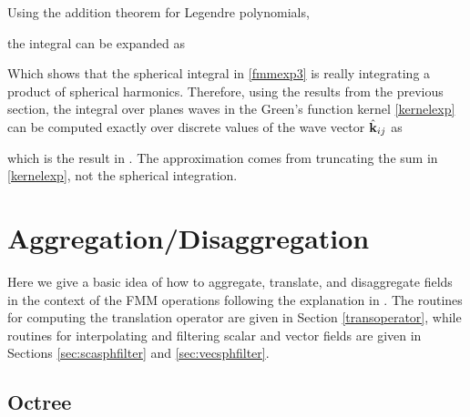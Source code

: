 Using the addition theorem for Legendre polynomials, 

the integral can be expanded as 

Which shows that the spherical integral in \eqref{fmmexp3} is really integrating a product of spherical harmonics. Therefore, using the results from the previous section, the integral over planes waves in the Green's function kernel \eqref{kernelexp} can be computed exactly over discrete values of the wave vector $\hat{\mathbf{k}}_{ij}$ as 

which is the result in \cite{yucel2008helmholtz}. The approximation comes from truncating the sum in \eqref{kernelexp}, not the spherical integration.  




\section{Aggregation/Disaggregation}

Here we give a basic idea of how to aggregate, translate, and disaggregate fields in the context of the FMM operations following the explanation in \cite{yucel2008helmholtz}. The routines for computing the translation operator are given in Section \ref{transoperator}, while routines for interpolating and filtering scalar and vector fields are given in Sections \ref{sec:scasphfilter} and \ref{sec:vecsphfilter}.

\subsection{Octree}


